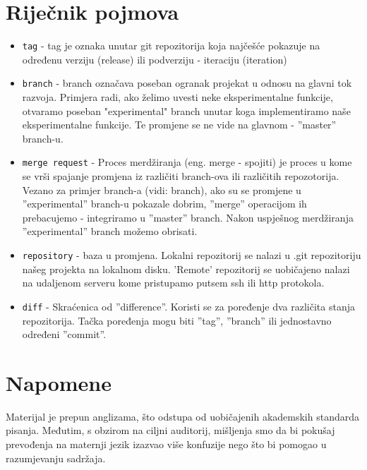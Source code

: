 \documentclass[times, utf8, seminar]{fit}
\begin{document}
\begin{itemize}



\appendix

\chapter{Riječnik pojmova}

\begin{itemize}
    \item \texttt{tag} - tag je oznaka unutar git repozitorija koja najčešće pokazuje na određenu verziju (release) ili podverziju - iteraciju (iteration)

    \item \texttt{branch} - branch označava poseban ogranak projekat u odnosu na glavni tok razvoja. Primjera radi, ako želimo uvesti neke eksperimentalne funkcije, otvaramo poseban "experimental" branch unutar koga implementiramo naše eksperimentalne funkcije. Te promjene se ne vide na glavnom - ''master'' branch-u.
    \item \texttt{merge request} - Proces merdžiranja (eng. merge - spojiti) je proces u kome se vrši spajanje promjena iz različiti branch-ova ili različitih repozotorija. Vezano za primjer branch-a (vidi: branch), ako su se promjene u ''experimental'' branch-u pokazale dobrim, ''merge'' operacijom ih prebacujemo - integriramo u ''master'' branch. Nakon uspješnog merdžiranja ''experimental'' branch možemo obrisati.
    \item \texttt{repository} - baza u promjena. Lokalni repozitorij se nalazi u .git repozitoriju našeg projekta na lokalnom disku. 'Remote' repozitorij se uobičajeno nalazi na udaljenom serveru kome pristupamo putsem ssh ili http protokola.
    \item \texttt{diff} - Skraćenica od ''difference''. Koristi se za poređenje dva različita stanja repozitorija. Tačka poređenja mogu biti ''tag'', ''branch'' ili jednostavno određeni ''commit''.
\end{itemize}

\chapter{Napomene}

Materijal je prepun anglizama, što odstupa od uobičajenih akademskih standarda pisanja. Međutim, s obzirom na ciljni auditorij, mišljenja smo da bi pokušaj prevođenja na maternji jezik izazvao više konfuzije nego što bi pomogao u razumjevanju sadržaja.


\end{itemize}
\end{document}
